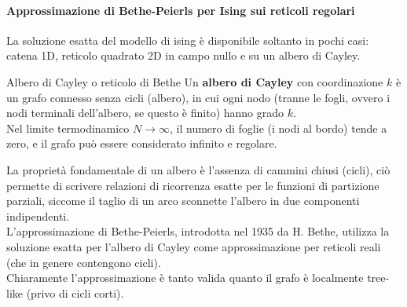 \paragraph{Approssimazione di Bethe-Peierls per Ising sui reticoli regolari}
La soluzione esatta del modello di ising è disponibile soltanto in pochi casi: catena 1D, reticolo quadrato 2D in campo nullo e su un albero di Cayley.\\

\begin{boxb}{Albero di Cayley o reticolo di Bethe}
Un \textbf{albero di Cayley} con coordinazione $k$ è un grafo connesso senza cicli (albero), in cui ogni nodo (tranne le fogli, ovvero i nodi terminali dell'albero, se questo è finito) hanno grado $k$.\\
Nel limite termodinamico $N \to \infty$, il numero di foglie (i nodi al bordo) tende a zero, e il grafo può essere considerato infinito e regolare.
\end{boxb}
La proprietà fondamentale di un albero è l'assenza di cammini chiusi (cicli), ciò permette di scrivere relazioni di ricorrenza esatte per le funzioni di partizione parziali, siccome il taglio di un arco sconnette l'albero in due componenti indipendenti.\\

L'approssimazione di Bethe-Peierls, introdotta nel 1935 da H. Bethe, utilizza la soluzione esatta per l'albero di Cayley come approssimazione per reticoli reali (che in genere contengono cicli).\\
Chiaramente l'approssimazione è tanto valida quanto il grafo è localmente tree-like (privo di cicli corti).\\

